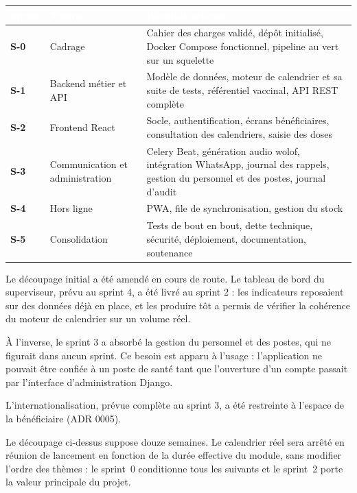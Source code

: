 \documentclass[11pt,a4paper]{article}
\newcommand{\rid}[1]{{\sffamily\bfseries\footnotesize\color{primary}#1}}
\newcommand{\hd}[1]{\textcolor{white}{\sffamily\bfseries\small #1}}
\newcommand{\rowhead}{\rowcolor{primary}}
\begin{document}
\vspace{2mm}
\noindent
\begin{tabularx}{\textwidth}{@{}C{1.6cm} R{3.4cm} L@{}}
\toprule
\rowhead \hd{Sprint} & \hd{Thème} & \hd{Résultat attendu} \\
\midrule
\rid{S-0} & Cadrage & Cahier des charges validé, dépôt initialisé, Docker Compose fonctionnel, pipeline au vert sur un squelette \\
\rid{S-1} & Backend métier et API & Modèle de données, moteur de calendrier et sa suite de tests, référentiel vaccinal, API REST complète \\
\rid{S-2} & Frontend React & Socle, authentification, écrans bénéficiaires, consultation des calendriers, saisie des doses \\
\rid{S-3} & Communication et administration & Celery Beat, génération audio wolof, intégration WhatsApp, journal des rappels, gestion du personnel et des postes, journal d'audit \\
\rid{S-4} & Hors ligne & PWA, file de synchronisation, gestion du stock \\
\rid{S-5} & Consolidation & Tests de bout en bout, dette technique, sécurité, déploiement, documentation, soutenance \\
\bottomrule
\end{tabularx}
Le découpage initial a été amendé en cours de route. Le tableau de bord du
superviseur, prévu au sprint 4, a été livré au sprint 2 : les indicateurs
reposaient sur des données déjà en place, et les produire tôt a permis de
vérifier la cohérence du moteur de calendrier sur un volume réel.

À l'inverse, le sprint 3 a absorbé la gestion du personnel et des postes,
qui ne figurait dans aucun sprint. Ce besoin est apparu à l'usage :
l'application ne pouvait être confiée à un poste de santé tant que
l'ouverture d'un compte passait par l'interface d'administration Django.

L'internationalisation, prévue complète au sprint 3, a été restreinte à
l'espace de la bénéficiaire (ADR 0005).

\begin{vigilance}
Le découpage ci-dessus suppose douze semaines. Le calendrier réel sera arrêté en réunion
de lancement en fonction de la durée effective du module, sans modifier l'ordre des
thèmes : le sprint~0 conditionne tous les suivants et le sprint~2 porte la valeur
principale du projet.
\end{vigilance}
\end{document}
